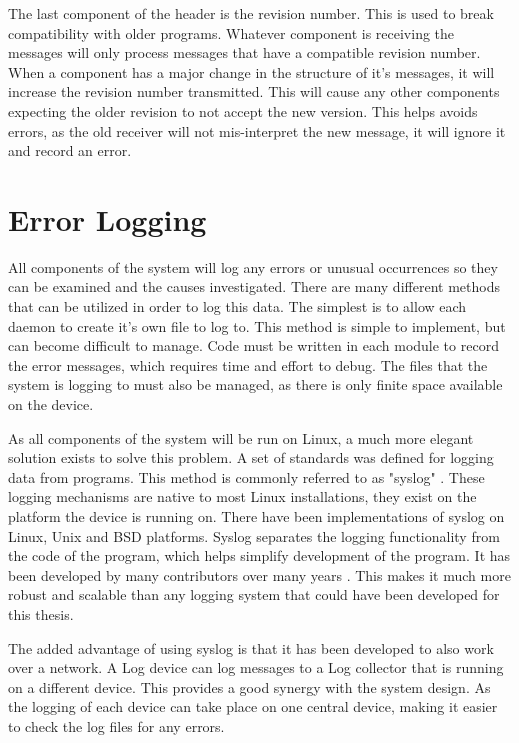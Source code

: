 The last component of the header is the revision number. This is used to break compatibility with older programs. Whatever component is receiving the messages will only process messages that have a compatible revision number. When a component has a major change in the structure of it's messages, it will increase the revision number transmitted. This will cause any other components expecting the older revision to not accept the new version. This helps avoids errors, as the old receiver will not mis-interpret the new message, it will ignore it and record an error.


\section{Error Logging}
\label{sec:dmesglogging}

All components of the system will log any errors or unusual occurrences so they can be examined and the causes investigated. There are many different methods that can be utilized in order to log this data. The simplest is to allow each daemon to create it's own file to log to. This method is simple to implement, but can become difficult to manage. Code must be written in each module to record the error messages, which requires time and effort to debug. The files that the system is logging to must also be managed, as there is only finite space available on the device.

As all components of the system will be run on Linux, a much more elegant solution exists to solve this problem. A set of standards was defined for logging data from programs. This method is commonly referred to as "syslog" \cite{syslog}. These logging mechanisms are native to most Linux installations, they exist on the platform the device is running on. There have been implementations of syslog on Linux, Unix and BSD platforms. Syslog separates the logging functionality from the code of the program, which helps simplify development of the program. It has been developed by many contributors over many years \cite{syslog}. This makes it much more robust and scalable than any logging system that could have been developed for this thesis.

The added advantage of using syslog is that it has been developed to also work over a network. A Log device can log messages to a Log collector that is running on a different device. This provides a good synergy with the system design. As the logging of each device can take place on one central device, making it easier to check the log files for any errors.

